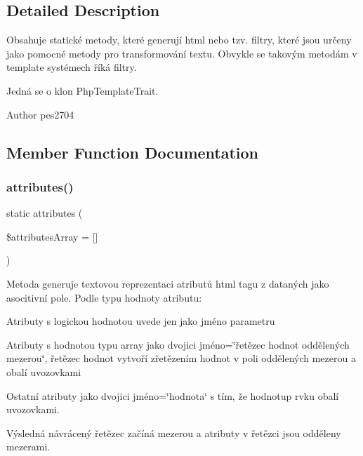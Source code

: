 \subsection{Detailed Description}
Obsahuje statické metody, které generují html nebo tzv. filtry, které jsou určeny jako pomocné metody pro transformování textu. Obvykle se takovým metodám v template systémech říká filtry.

Jedná se o klon Php\+Template\+Trait.

\begin{DoxyAuthor}{Author}
pes2704 
\end{DoxyAuthor}


\subsection{Member Function Documentation}
\mbox{\label{class_pes_1_1_text_1_1_html_a52cc586be5c6248939b081a8fd7f187d}} 
\subsubsection{\texorpdfstring{attributes()}{attributes()}}
{\footnotesize\ttfamily static attributes (\begin{DoxyParamCaption}\item[{}]{\$attributes\+Array = {\ttfamily \mbox{[}\mbox{]}} }\end{DoxyParamCaption})\hspace{0.3cm}{\ttfamily [static]}}

Metoda generuje textovou reprezentaci atributů html tagu z dataných jako asocitivní pole. Podle typu hodnoty atributu\+: 
\begin{DoxyItemize}
\item Atributy s logickou hodnotou uvede jen jako jméno parametru 
\item Atributy s hodnotou typu array jako dvojici jméno=\char`\"{}řetězec hodnot oddělených mezerou\char`\"{}, řetězec hodnot vytvoří zřetězením hodnot v poli oddělených mezerou a obalí uvozovkami 
\item Ostatní atributy jako dvojici jméno=\char`\"{}hodnota\char`\"{} s tím, že hodnotup rvku obalí uvozovkami. 
\end{DoxyItemize}Výsledná návrácený řetězec začíná mezerou a atributy v řetězci jsou odděleny mezerami.

